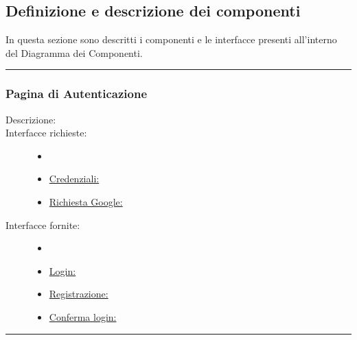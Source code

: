 \documentclass[11pt, a4paper]{article}
\theoremstyle{definition} %
\begin{document}
\newpage
\subsection{Definizione e descrizione dei componenti}
In questa sezione sono descritti i componenti e le interfacce presenti
all'interno del Diagramma dei Componenti.

\begin{center}
    \rule{5cm}{1pt}
\end{center}

\subsubsection{Pagina di Autenticazione}
\begin{description}
    \item[Descrizione:]

    \item[Interfacce richieste:]
    \begin{itemize}
        \item[]

        \item \underline{Credenziali:}
        \item \underline{Richiesta Google:}
    \end{itemize}

    \item[Interfacce fornite:]
    \begin{itemize}
        \item[]

        \item \underline{Login:}
        \item \underline{Registrazione:}
        \item \underline{Conferma login:}
    \end{itemize}
\end{description}

\begin{center}
    \rule{5cm}{1pt}
\end{center}
\end{document}
